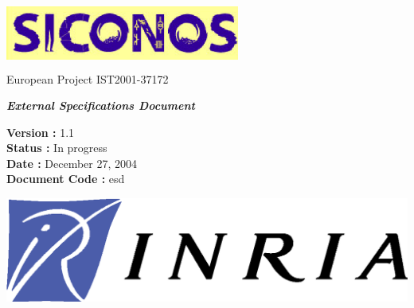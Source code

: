 \thispagestyle{empty}

\begin{center}
\includegraphics[height=23mm, width=77mm]{figure/siconos.eps}\\
\textsf{European Project IST2001-37172}\\[6cm]
\end{center}

\begin{center}
\huge
\textsf{\textbf{\textit{External Specifications Document}}}\\[2.5cm]
\end{center}

\large
\begin{center}
\textsf{\textbf{Version :} 1.1}\\
\textsf{\textbf{Status :}  In progress}\\
\textsf{\textbf{Date :} December 27, 2004} \\ %
\textsf{\textbf{Document Code :} \acs{esd}}\\[5cm]

\end{center}

\normalsize

\begin{flushright}
\includegraphics[scale=0.3]{figure/Logo-INRIA.eps}
\end{flushright}

\clearpage






\normalsize

